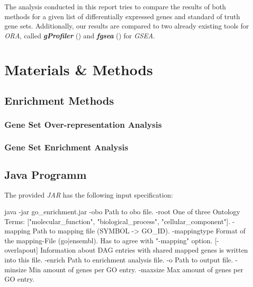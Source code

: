 \documentclass[12pt]{article}
\begin{document}
The analysis conducted in this report tries to compare the results of both methods
for a given list of differentially expressed genes and standard of truth gene sets.
Additionally, our results are compared to two already existing tools for \textit{ORA}, called
\textit{\textbf{gProfiler}} (\cite{gprofiler}) and \textit{\textbf{fgsea}} (\cite{fgsea})
for \textit{GSEA}.

\section{Materials \& Methods}
\subsection{Enrichment Methods}\label{sec:Enrichment-Methods}
\subsubsection{Gene Set Over-representation Analysis}\label{sec:Gene-Set-Over-representation-Analysis}

\subsubsection{Gene Set Enrichment Analysis}\label{sec:Gene-Set-Enrichment-Analysis}

\newpage
\subsection{Java Programm}\label{sec:Java-Programm}
The provided \textit{JAR} has the following input specification:
\begin{verbatim*}
java -jar go_enrichment.jar
  -obo                   Path to obo file.
  -root                  One of three Ontology Terms:
                         ["molecular_function",
                         "biological_process",
                         "cellular_component"].
  -mapping               Path to mapping file (SYMBOL -> GO_ID).
  -mappingtype           Format of the mapping-File (go|ensembl). 
                         Has to agree with "-mapping" option.
  [-overlapout]          Information about DAG  entries  with shared mapped
                         genes is written into this file.
  -enrich                Path to enrichment analysis file.
  -o                     Path to output file.
  -minsize               Min amount of genes per GO entry.
  -maxsize               Max amount of genes per GO entry.
\end{verbatim*}
\end{document}
